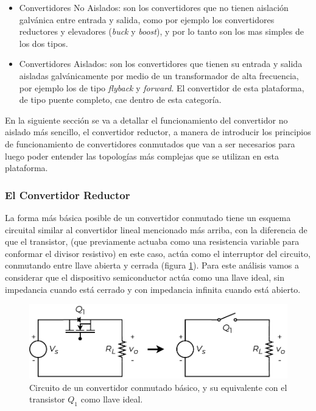 \begin{itemize}
    \item {\SemiBold Convertidores No Aislados:} son los convertidores que no tienen aislación galvánica entre entrada y salida, como por ejemplo los convertidores reductores y elevadores (\textit{buck} y \textit{boost}), y por lo tanto son los mas simples de los dos tipos.
    \item {\SemiBold Convertidores Aislados:} son los convertidores que tienen su entrada y salida aisladas galvánicamente por medio de un transformador de alta frecuencia, por ejemplo los de tipo \textit{flyback} y \textit{forward}. El convertidor de esta plataforma, de tipo puente completo, cae dentro de esta categoría.
\end{itemize}

En la siguiente sección se va a detallar el funcionamiento del convertidor no aislado más sencillo, el convertidor reductor, a manera de introducir los principios de funcionamiento de convertidores conmutados que van a ser necesarios para luego poder entender las topologías más complejas que se utilizan en esta plataforma.\\

\subsubsection{El Convertidor Reductor}

La forma más básica posible de un convertidor conmutado tiene un esquema circuital similar al convertidor lineal mencionado más arriba, con la diferencia de que el transistor, (que previamente actuaba como una resistencia variable para conformar el divisor resistivo) en este caso, actúa como el interruptor del circuito, conmutando entre llave abierta y cerrada (figura \ref{proto_reductor}). Para este análisis vamos a considerar que el dispositivo semiconductor actúa como una llave ideal, sin impedancia cuando está cerrado y con impedancia infinita cuando está abierto.\\

\begin{figure}[H]
    \centering
    \includegraphics[scale=0.6]{Imagenes/Proto Reductor.pdf}
    \caption{Circuito de un convertidor conmutado básico, y su equivalente con el transistor $Q_1$ como llave ideal.}
    \label{proto_reductor}
\end{figure}


